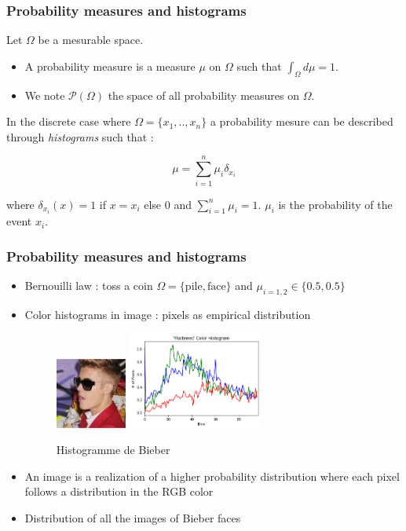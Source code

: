 \documentclass[french,9pt]{beamer}
\begin{document}
\begin{frame}
\frametitle{Probability measures and histograms}

Let $\Omega$ be a mesurable space.
\begin{itemize}
\item A probability measure is a measure $\mu$ on $\Omega$ such that $\int_{\Omega} d\mu=1$.
\item We note $\mathcal{P}(\Omega)$ the space of all probability measures on $\Omega$.
\end{itemize}

In the discrete case where  $\Omega=\{x_{1},..,x_{n}\}$ a probability mesure can be described through \emph{histograms} such that :

$$\mu=\sum_{i=1}^{n} \mu_{i} \delta_{x_{i}} $$

 where $\delta_{x_{i}}(x)=1$ if $x=x_{i}$ else $0$ and $\sum_{i=1}^{n} \mu_{i}=1$. $\mu_{i}$ is the probability of the event $x_{i}$. 


\end{frame}


\begin{frame}
\frametitle{Probability measures and histograms}

\begin{itemize}
\item Bernouilli law : toss a coin $\Omega=\{\text{pile},\text{face}\}$ and $\mu_{i=1,2} \in \{0.5,0.5\}$
\item Color histograms in image : pixels as empirical distribution
\begin{figure}
  \begin{center}
    \includegraphics[width=0.22\textwidth]{fig/biber.png}\hspace{1mm}
     \includegraphics[width=0.42\textwidth]{fig/hist_biber.png}
  \end{center}
 \caption{Histogramme de Bieber}
\end{figure}
\item An image is a realization of a higher probability distribution where each pixel follows a distribution in the RGB color
\item Distribution of all the images of Bieber faces 
\end{itemize}
\end{frame}
\end{document}
